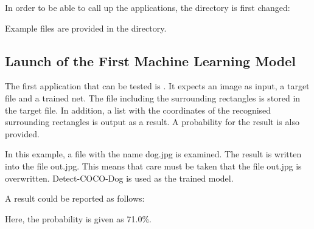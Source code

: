 \bigskip



In order to be able to call up the applications, the directory is first changed:

\medskip


\medskip

Example files are provided in the  directory. 


\subsection{Launch of the First Machine Learning Model}

The first application that can be tested is . It expects an image as input, a target file and a trained net. The file including the surrounding rectangles is stored in the target file. In addition, a list with the coordinates of the recognised surrounding rectangles is output as a result. A probability for the result is also provided. 


In this example, a file with the name dog.jpg is examined. The result is written into the file out.jpg. This means that care must be taken that the file out.jpg is overwritten. Detect-COCO-Dog is used as the trained model. 

\medskip


\medskip

A result could be reported as follows:

\medskip




\medskip


Here, the probability is given as 71.0\%.

\bigskip





